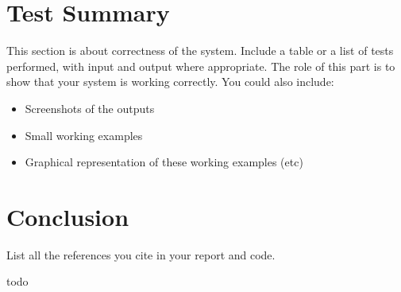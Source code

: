 \documentclass[letterpaper,12pt]{article}
\begin{document}
\section{Test Summary}
\label{sec:test-summary}

This section is about correctness of the system. Include a table or a list of tests performed, with input and output where appropriate. The role of this part is to show that your system is working correctly. You could also include:

\begin{itemize}
    \item Screenshots of the outputs
    \item Small working examples
    \item Graphical representation of these working examples (etc)
\end{itemize}


\section{Conclusion}
\label{sec:conclusion}

List all the references you cite in your report and code.


\newpage
\begin{appendices}

todo

\end{appendices}
\end{document}
